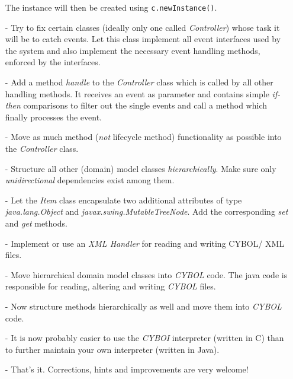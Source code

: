 \begin{itemize}
        The instance will then be created using \texttt{c.newInstance()}.
    \item[-] Try to fix certain classes (ideally only one called \emph{Controller})
        whose task it will be to catch events. Let this class implement all event
        interfaces used by the system and also implement the necessary event
        handling methods, enforced by the interfaces.
    \item[-] Add a method \emph{handle} to the \emph{Controller} class which is
        called by all other handling methods. It receives an event as parameter
        and contains simple \emph{if-then} comparisons to filter out the single
        events and call a method which finally processes the event.
    \item[-] Move as much method (\emph{not} lifecycle method) functionality as
        possible into the \emph{Controller} class.
    \item[-] Structure all other (domain) model classes \emph{hierarchically}.
        Make sure only \emph{unidirectional} dependencies exist among them.
    \item[-] Let the \emph{Item} class encapsulate two additional attributes of
        type \emph{java.lang.Object} and \emph{javax.swing.MutableTreeNode}.
        Add the corresponding \emph{set} and \emph{get} methods.
    \item[-] Implement or use an \emph{XML Handler} for reading and writing
        CYBOL/ XML files.
    \item[-] Move hierarchical domain model classes into \emph{CYBOL} code.
        The java code is responsible for reading, altering and writing
        \emph{CYBOL} files.
    \item[-] Now structure methods hierarchically as well and move them into
        \emph{CYBOL} code.
    \item[-] It is now probably easier to use the \emph{CYBOI} interpreter
        (written in C) than to further maintain your own interpreter (written
        in Java).
    \item[-] That's it. Corrections, hints and improvements are very welcome!
\end{itemize}
